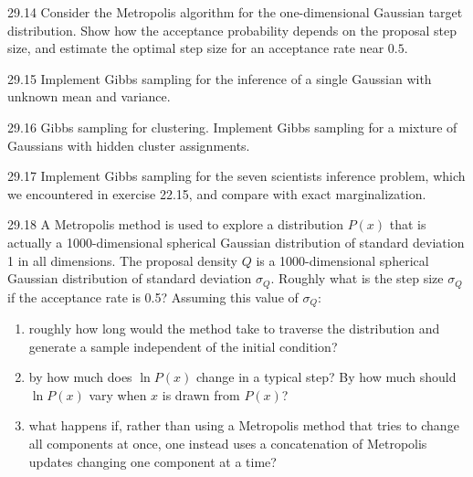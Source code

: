 \documentclass[12pt, a4paper]{article}
\begin{document}
\begin{prob}{29.14}
Consider the Metropolis algorithm for the one-dimensional Gaussian target distribution. Show how the acceptance probability depends on the proposal step size, and estimate the optimal step size for an acceptance rate near $0.5$.
\end{prob}
\begin{sol}
\end{sol}
\bigskip

\begin{prob}{29.15}
Implement Gibbs sampling for the inference of a single Gaussian with unknown mean and variance.
\end{prob}
\begin{sol}
\end{sol}
\bigskip

\begin{prob}{29.16}
Gibbs sampling for clustering. Implement Gibbs sampling for a mixture of Gaussians with hidden cluster assignments.
\end{prob}
\begin{sol}
\end{sol}
\bigskip

\begin{prob}{29.17}
Implement Gibbs sampling for the seven scientists inference problem, which we encountered in exercise 22.15, and compare with exact marginalization.
\end{prob}
\begin{sol}
\end{sol}
\bigskip

\begin{prob}{29.18}
A Metropolis method is used to explore a distribution $P(x)$ that is actually a 1000-dimensional spherical Gaussian distribution of standard deviation 1 in all dimensions. The proposal density $Q$ is a 1000-dimensional spherical Gaussian distribution of standard deviation $\sigma_Q$. Roughly what is the step size $\sigma_Q$ if the acceptance rate is 0.5? Assuming this value of $\sigma_Q$:
\begin{enumerate}
    \item[(a)] roughly how long would the method take to traverse the distribution and generate a sample independent of the initial condition?
    \item[(b)] by how much does $\ln P(x)$ change in a typical step? By how much should $\ln P(x)$ vary when $x$ is drawn from $P(x)$?
    \item[(c)] what happens if, rather than using a Metropolis method that tries to change all components at once, one instead uses a concatenation of Metropolis updates changing one component at a time?
\end{enumerate}
\end{prob}
\begin{sol}
\end{sol}
\bigskip
\end{document}
